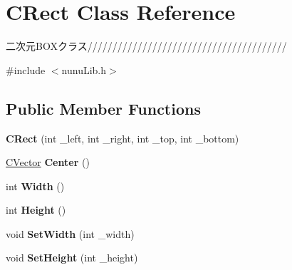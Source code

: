 \hypertarget{class_c_rect}{}\section{C\+Rect Class Reference}
\label{class_c_rect}


二次元\+B\+O\+Xクラス////////////////////////////////////////  




{\ttfamily \#include $<$nunu\+Lib.\+h$>$}

\subsection*{Public Member Functions}
\begin{DoxyCompactItemize}
\item 
{\bfseries C\+Rect} (int \+\_\+left, int \+\_\+right, int \+\_\+top, int \+\_\+bottom)\hypertarget{class_c_rect_aa7328a334aa6519f731e55b185d9a75d}{}\label{class_c_rect_aa7328a334aa6519f731e55b185d9a75d}

\item 
\hyperlink{class_c_vector}{C\+Vector} {\bfseries Center} ()\hypertarget{class_c_rect_ad19e26519993f258cf7030cd8dffb95e}{}\label{class_c_rect_ad19e26519993f258cf7030cd8dffb95e}

\item 
int {\bfseries Width} ()\hypertarget{class_c_rect_ae1eed1eed18eaf90f1850f0cc2b4ee5c}{}\label{class_c_rect_ae1eed1eed18eaf90f1850f0cc2b4ee5c}

\item 
int {\bfseries Height} ()\hypertarget{class_c_rect_a25280cc1438c30f7d71f7adc19584a7e}{}\label{class_c_rect_a25280cc1438c30f7d71f7adc19584a7e}

\item 
void {\bfseries Set\+Width} (int \+\_\+width)\hypertarget{class_c_rect_a8daaae317869f628de3b55072337ff33}{}\label{class_c_rect_a8daaae317869f628de3b55072337ff33}

\item 
void {\bfseries Set\+Height} (int \+\_\+height)\hypertarget{class_c_rect_a7bdc8877386727761bf1d7954b9a8edd}{}\label{class_c_rect_a7bdc8877386727761bf1d7954b9a8edd}

\end{DoxyCompactItemize}
